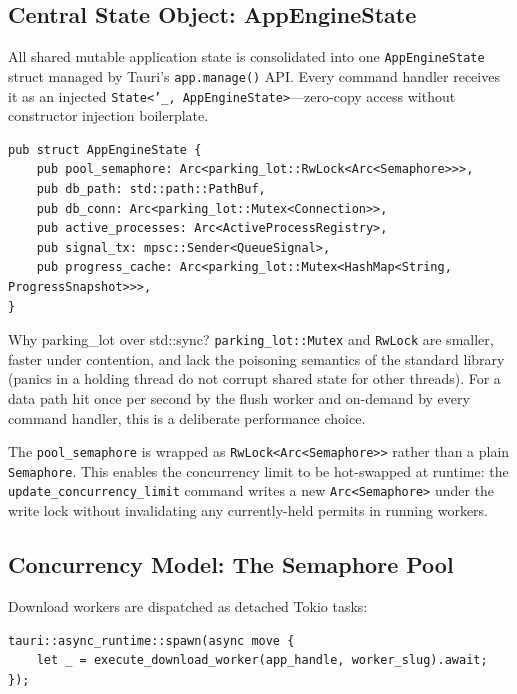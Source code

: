 \documentclass[10pt,letterpaper]{article}
\begin{document}
\subsection{Central State Object: AppEngineState}

All shared mutable application state is consolidated into one \texttt{AppEngineState} struct
managed by Tauri's \texttt{app.manage()} API. Every command handler receives it as an
injected \texttt{State<'\_, AppEngineState>}---zero-copy access without constructor injection
boilerplate.

\begin{lstlisting}[caption={AppEngineState (lib.rs)}]
pub struct AppEngineState {
    pub pool_semaphore: Arc<parking_lot::RwLock<Arc<Semaphore>>>,
    pub db_path: std::path::PathBuf,
    pub db_conn: Arc<parking_lot::Mutex<Connection>>,
    pub active_processes: Arc<ActiveProcessRegistry>,
    pub signal_tx: mpsc::Sender<QueueSignal>,
    pub progress_cache: Arc<parking_lot::Mutex<HashMap<String, ProgressSnapshot>>>,
}
\end{lstlisting}

\begin{insightbox}{Why parking\_lot over std::sync?}
\texttt{parking\_lot::Mutex} and \texttt{RwLock} are smaller, faster under contention,
and lack the poisoning semantics of the standard library (panics in a holding thread do
not corrupt shared state for other threads). For a data path hit once per second by the
flush worker and on-demand by every command handler, this is a deliberate performance choice.
\end{insightbox}

The \texttt{pool\_semaphore} is wrapped as \texttt{RwLock<Arc<Semaphore>>} rather than a
plain \texttt{Semaphore}. This enables the concurrency limit to be hot-swapped at runtime:
the \texttt{update\_concurrency\_limit} command writes a new \texttt{Arc<Semaphore>} under
the write lock without invalidating any currently-held permits in running workers.

\subsection{Concurrency Model: The Semaphore Pool}

Download workers are dispatched as detached Tokio tasks:

\begin{lstlisting}[caption={Non-blocking task dispatch (commands/queue.rs)}]
tauri::async_runtime::spawn(async move {
    let _ = execute_download_worker(app_handle, worker_slug).await;
});
\end{lstlisting}
\end{document}
